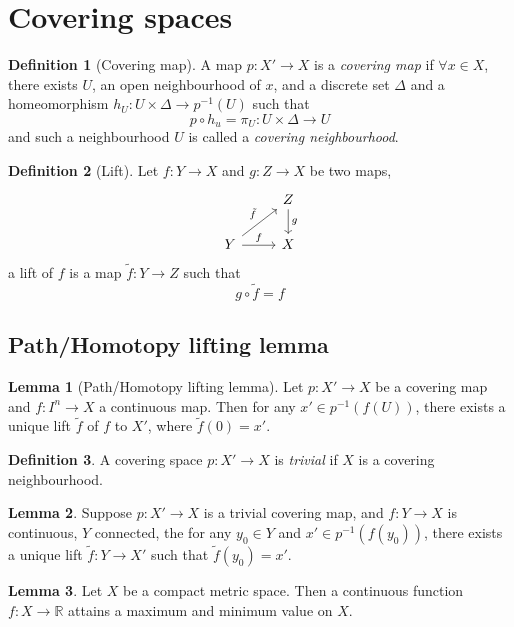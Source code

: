 \documentclass[a4paper,14pt]{extarticle}
\theoremstyle{definition}
\newtheorem*{definition}{Definition}
\newtheorem*{lemma}{Lemma}
\begin{document}
\section{Covering spaces}
\begin{definition}[Covering map]
  A map $p:X'\rightarrow X$ is a \emph{covering map} if $\forall x\in X$, there exists
  $U$, an open neighbourhood of $x$, and a discrete set $\Delta$ and a homeomorphism 
  $h_U:U\times\Delta\rightarrow p^{-1}(U)$ such that \[p\circ h_u=\pi_U:U\times\Delta\rightarrow 
  U\] and such a neighbourhood $U$ is called a \emph{covering neighbourhood}.
\end{definition}

\begin{definition}[Lift]
  Let $f:Y\rightarrow X$ and $g:Z\rightarrow X$ be two maps,
  \[
    \begin{tikzcd}
      &Z\arrow{d}{g} \\ Y\arrow{ur}{\tilde{f}} \arrow{r}{f}&X
    \end{tikzcd}\]
  a lift of $f$ is a map $\tilde{f}:Y\rightarrow Z$ such that \[g\circ\tilde{f}=f\]
\end{definition}

\subsection{Path/Homotopy lifting lemma}
\begin{lemma}[Path/Homotopy lifting lemma]
  Let $p:X'\rightarrow X$ be a covering map and $f:I^n\rightarrow X$ a continuous map.
  Then for any $x'\in p^{-1}(f(U))$, there exists a unique lift $\tilde{f}$ of $f$ to 
  $X'$, where $\tilde{f}(0)=x'$. 
\end{lemma}

\begin{definition}
  A covering space $p:X'\rightarrow X$ is \emph{trivial} if $X$ is a covering neighbourhood.
\end{definition}

\begin{lemma}
  Suppose $p:X'\rightarrow X$ is a trivial covering map, and $f:Y\rightarrow X$ is continuous, 
  $Y$ connected, the for any $y_0\in Y$ and $x'\in p^{-1}(f(y_0))$, there exists a unique 
  lift $\tilde{f}:Y\rightarrow X'$ such that $\tilde{f}(y_0)=x'$.
\end{lemma}

\begin{lemma}
  Let $X$ be a compact metric space. Then a continuous function $f:X\rightarrow\mathbb{R}$  attains a maximum and minimum value on $X$.
\end{lemma}
\end{document}

